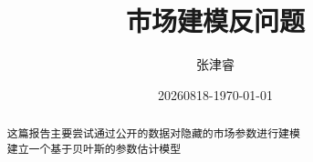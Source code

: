\documentclass{article}
\title{市场建模反问题}
\author{张津睿}
\date{20260818-\today}
\begin{document}
\maketitle

\begin{abstract}
    这篇报告主要尝试通过公开的数据对隐藏的市场参数进行建模\\
    建立一个基于贝叶斯的参数估计模型
    \cite{EMH}
\end{abstract}

\tableofcontents
\newpage


\end{document}
